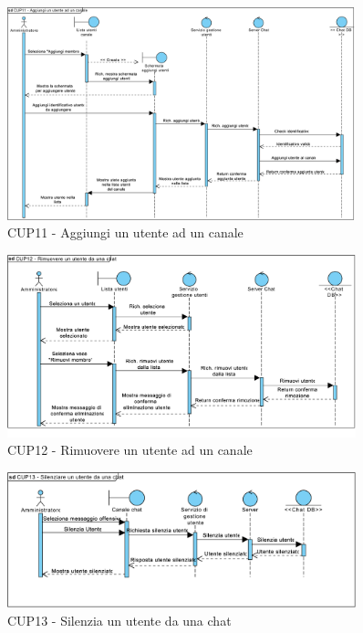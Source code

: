 \begin{figure}
	\centering
	\includegraphics[width=0.9\textwidth]{imgs/gruppo6/sequence/CUP11_aggiungi_un_utente_ad_un_canale.pdf}
	\caption{CUP11 - Aggiungi un utente ad un canale}
	\label{fig:seq-cup11}
\end{figure}

\begin{figure}
	\centering
	\includegraphics[width=0.9\textwidth]{imgs/gruppo6/sequence/CUP12_rimuovere_un_utente_da_un_canale.pdf}
	\caption{CUP12 - Rimuovere un utente ad un canale}
	\label{fig:seq-cup12}
\end{figure}

\begin{figure}
	\centering
	\includegraphics[width=0.9\textwidth]{imgs/gruppo6/sequence/CUP13_silenzia_un_utente_da_una_chat.pdf}
	\caption{CUP13 - Silenzia un utente da una chat}
	\label{fig:seq-cup13}
\end{figure}

